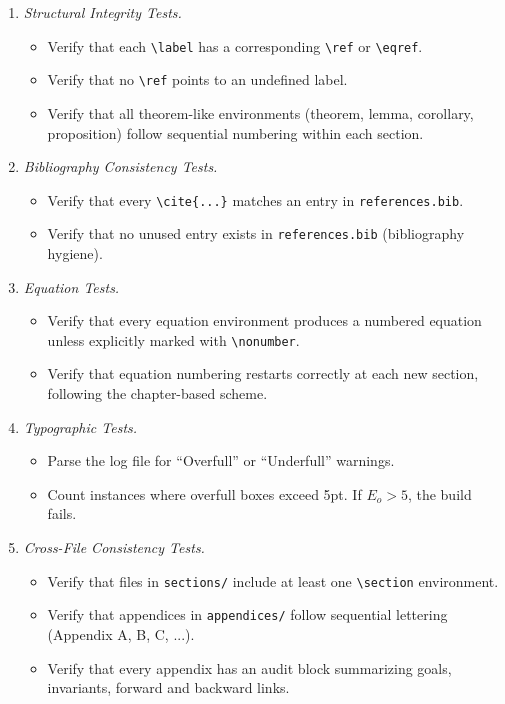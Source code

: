 \begin{enumerate}
  \item \emph{Structural Integrity Tests.}  
  \begin{itemize}
    \item Verify that each \texttt{\textbackslash label} has a corresponding \texttt{\textbackslash ref} or \texttt{\textbackslash eqref}.  
    \item Verify that no \texttt{\textbackslash ref} points to an undefined label.  
    \item Verify that all theorem-like environments (theorem, lemma, corollary, proposition) follow sequential numbering within each section.  
  \end{itemize}
  \item \emph{Bibliography Consistency Tests.}  
  \begin{itemize}
    \item Verify that every \texttt{\textbackslash cite\{...\}} matches an entry in \texttt{references.bib}.  
    \item Verify that no unused entry exists in \texttt{references.bib} (bibliography hygiene).  
  \end{itemize}
  \item \emph{Equation Tests.}  
  \begin{itemize}
    \item Verify that every equation environment produces a numbered equation unless explicitly marked with \texttt{\textbackslash nonumber}.  
    \item Verify that equation numbering restarts correctly at each new section, following the chapter-based scheme.  
  \end{itemize}
  \item \emph{Typographic Tests.}  
  \begin{itemize}
    \item Parse the log file for “Overfull” or “Underfull” warnings.  
    \item Count instances where overfull boxes exceed 5pt. If $E_o > 5$, the build fails.  
  \end{itemize}
  \item \emph{Cross-File Consistency Tests.}  
  \begin{itemize}
    \item Verify that files in \texttt{sections/} include at least one \texttt{\textbackslash section} environment.  
    \item Verify that appendices in \texttt{appendices/} follow sequential lettering (Appendix A, B, C, ...).  
    \item Verify that every appendix has an audit block summarizing goals, invariants, forward and backward links.  
  \end{itemize}
\end{enumerate}

